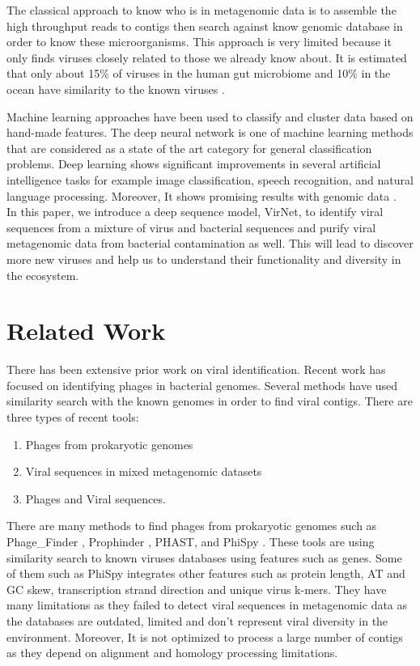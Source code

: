 \documentclass[conference]{IEEEtran}
\begin{document}
The classical approach to know who is in metagenomic data is to assemble the high throughput reads to contigs then search against know genomic database in order to know these microorganisms. This approach is very limited because it only finds viruses closely related to those we already know about. It is estimated that only about 15\% of viruses in the human gut microbiome and 10\% in the ocean have similarity to the known viruses \cite{ren2017virfinder}. 

Machine learning approaches have been used to classify and cluster data based on hand-made features. The deep neural network is one of machine learning methods that are considered as a state of the art category for general classification problems. Deep learning shows significant improvements in several artificial intelligence tasks for example image classification, speech recognition, and natural language processing. Moreover, It shows promising results with genomic data \cite{angermueller2016deep}. \\

In this paper, we introduce a deep sequence model, VirNet, to identify viral sequences from a mixture of virus and bacterial sequences and purify viral metagenomic data from bacterial contamination as well. This will lead to discover more new viruses and help us to understand their functionality and diversity in the ecosystem.

\section{Related Work}

There has been extensive prior work on viral identification. Recent work has focused on identifying phages in bacterial genomes. Several methods have used similarity search with the known genomes in order to find viral contigs. There are three types of recent tools:
\begin{enumerate}
	\item Phages from prokaryotic genomes
	\item Viral sequences in mixed metagenomic datasets
	\item Phages and Viral sequences. 
\end{enumerate} 

There are many methods to find phages from prokaryotic genomes such as Phage\_Finder \cite{fouts2006phage_finder}, Prophinder \cite{lima2008prophinder}, PHAST\cite{zhou2011phast}, and PhiSpy \cite{akhter2012phispy}. These tools are using similarity search to known viruses databases using features such as genes. Some of them such as PhiSpy integrates other features such as protein length, AT and GC skew, transcription strand direction and unique virus k-mers. They have many limitations as they failed to detect viral sequences in metagenomic data as the databases are outdated, limited and don't represent viral diversity in the environment. Moreover, It is not optimized to process a large number of contigs \cite{roux2015virsorter} as they depend on alignment and homology processing limitations. 
\end{document}
